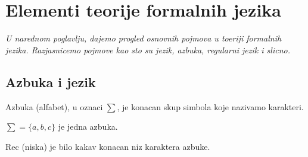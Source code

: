 \documentclass{memoir}
\begin{document}
% 

\chapter{Elementi teorije formalnih jezika}
\emph{U narednom poglavlju, dajemo progled osnovnih pojmova u toeriji formalnih jezika. Razjasnicemo pojmove kao sto su jezik, azbuka, regularni jezik i slicno.}
\newpage

\section{Azbuka i jezik}

\begin{definicija}
    Azbuka (alfabet), u oznaci $\sum$, je konacan skup simbola koje nazivamo karakteri.
\end{definicija}

\begin{primer}
 $\sum = \{a, b, c \}$ je jedna azbuka.
\end{primer}

\begin{definicija}
 Rec (niska) je bilo kakav konacan niz karaktera azbuke.
\end{definicija}
\end{document}

